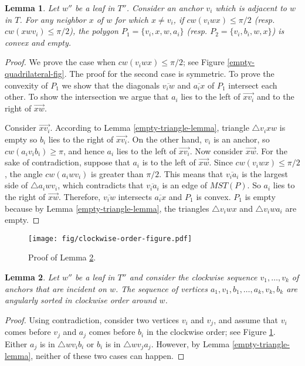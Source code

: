 \documentclass[11pt,a4paper]{article}
\newcommand{\cw}{cw}
\newtheorem{lemma}{Lemma}
\begin{document}
\begin{lemma}
\label{empty-quadrilateral-lemma}
Let $w''$ be a leaf in $T''$. Consider an anchor $v_i$ which is adjacent to $w$ in $T$. For any neighbor $x$ of $w$ for which $x\neq v_i$, if $\cw(v_iwx)\le\pi/2$ (resp. $\cw(xwv_i)\le\pi/2$), the polygon $P_1=\{v_i,x,w,a_i\}$ (resp. $P_2 = \{v_i,b_i,w,x\}$) is convex and empty.
\end{lemma}
\begin{proof}
We prove the case when $\cw(v_iwx)\le\pi/2$; see Figure \ref{empty-quadrilateral-fig}. The proof for the second case is symmetric. To prove the convexity of $P_1$ we show that the diagonals $\overline{v_iw}$ and $\overline{a_ix}$ of $P_1$ intersect each other. To show the intersection we argue that $a_i$ lies to the left of $\overrightarrow{xv_i}$ and to the right of $\overrightarrow{xw}$.

Consider $\overrightarrow{xv_i}$. According to Lemma \ref{empty-triangle-lemma}, triangle $\bigtriangleup v_ixw$ is empty so $b_i$ lies to the right  of $\overrightarrow{xv_i}$. On the other hand, $v_i$ is an anchor, so $\cw(a_iv_ib_i) \ge \pi$, and hence $a_i$ lies to the left of $\overrightarrow{xv_i}$.
Now consider $\overrightarrow{xw}$. For the sake of contradiction, suppose that $a_i$ is to the left of $\overrightarrow{xw}$. Since $\cw(v_iwx)\le\pi/2$, the angle $\cw(a_iwv_i)$ is greater than $\pi/2$. This means that $\overline{v_ia_i}$ is the largest side of $\bigtriangleup a_iwv_i$, which contradicts that $\overline{v_ia_i}$ is an edge of $MST(P)$. So $a_i$ lies to the right of $\overrightarrow{xw}$. Therefore, $\overline{v_iw}$ intersects $\overline{a_ix}$ and $P_1$ is convex. $P_1$ is empty because by Lemma \ref{empty-triangle-lemma}, the triangles $\bigtriangleup v_iwx$ and $\bigtriangleup v_iwa_i$ are empty. 
\end{proof}

\begin{figure}[ht]
  \centering
    \texttt{[image: fig/clockwise-order-figure.pdf]}
  \caption{Proof of Lemma \ref{clockwise-order-lemma}.}
\label{clockwise-order-fig}
\end{figure}

\begin{lemma}
\label{clockwise-order-lemma}
Let $w''$ be a leaf in $T''$ and consider the clockwise sequence $v_1,\dots,v_k$ of anchors that are incident on $w$. The sequence of vertices $a_1, v_1, b_1, \dots,a_k,v_k,b_k$ are angularly sorted in clockwise order around $w$. 
\end{lemma}
\begin{proof}
 Using contradiction, consider two vertices $v_i$ and $v_j$, and assume that $v_i$ comes before $v_j$ and $a_j$ comes before $b_i$ in the clockwise order; see Figure \ref{clockwise-order-fig}. Either $a_j$ is in $\bigtriangleup wv_ib_i$ or $b_i$ is in $\bigtriangleup wv_ja_j$. However, by Lemma \ref{empty-triangle-lemma}, neither of these two cases can happen.
\end{proof}
\end{document}

